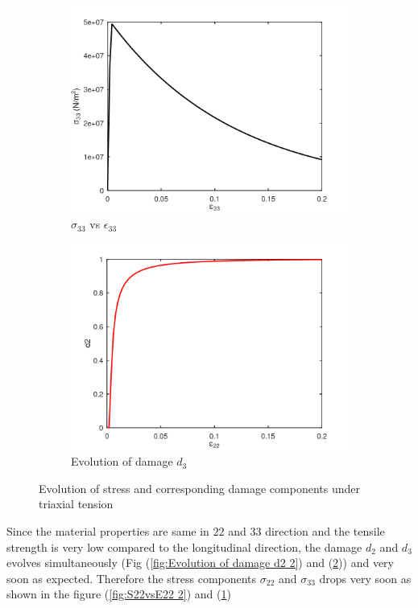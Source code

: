 \documentclass[a4paper,12pt]{extarticle}
\begin{document}
\begin{figure}[htbp]\ContinuedFloat
     \begin{subfigure}{0.45\textwidth}
         \centering
         \includegraphics[width=1.25\textwidth]{24.S33vsE33.png}
         \caption{$\sigma_{33}$ vs $\epsilon_{33}$}
         \label{fig:S33vsE33}
     \end{subfigure}
     \hfill
     \begin{subfigure}{0.45\textwidth}
         \centering
         \includegraphics[width=1.25\textwidth]{24.d2.png}
         \caption{Evolution of damage $d_{3}$}
         \label{fig:Evolution of damage d3}
     \end{subfigure}     
        \caption{Evolution of stress and corresponding damage components under triaxial tension}
        \label{fig:Evolution of damage under triaxial tension}     
\end{figure}
Since the material properties are same in $22$ and $33$ direction and the tensile strength is very low compared to the longitudinal direction, the damage $d_{2}$ and $d_{3}$ evolves simultaneously (Fig (\ref{fig:Evolution of damage d2 2}) and (\ref{fig:Evolution of damage d3})) and very soon as expected. Therefore the stress components $\sigma_{22}$ and $\sigma_{33}$ drops very soon as shown in the figure (\ref{fig:S22vsE22 2}) and (\ref{fig:S33vsE33})   
\end{document}
